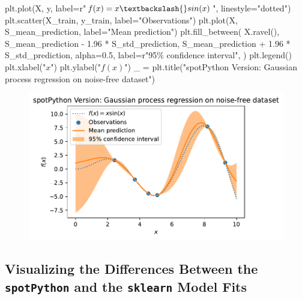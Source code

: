 \documentclass[
  letterpaper,
  DIV=11,
  numbers=noendperiod]{scrreprt}
\newenvironment{Shaded}{\begin{snugshade}}{\end{snugshade}}
\newcommand{\FloatTok}[1]{\textcolor[rgb]{0.68,0.00,0.00}{#1}}
\newcommand{\NormalTok}[1]{\textcolor[rgb]{0.00,0.23,0.31}{#1}}
\newcommand{\OperatorTok}[1]{\textcolor[rgb]{0.37,0.37,0.37}{#1}}
\newcommand{\SpecialCharTok}[1]{\textcolor[rgb]{0.37,0.37,0.37}{#1}}
\newcommand{\StringTok}[1]{\textcolor[rgb]{0.13,0.47,0.30}{#1}}
\newcommand{\VerbatimStringTok}[1]{\textcolor[rgb]{0.13,0.47,0.30}{#1}}
\begin{document}
\begin{Shaded}
\begin{Highlighting}[]
\NormalTok{plt.plot(X, y, label}\OperatorTok{=}\VerbatimStringTok{r"$f(x) = x \textbackslash{}sin(x)$"}\NormalTok{, linestyle}\OperatorTok{=}\StringTok{"dotted"}\NormalTok{)}
\NormalTok{plt.scatter(X\_train, y\_train, label}\OperatorTok{=}\StringTok{"Observations"}\NormalTok{)}
\NormalTok{plt.plot(X, S\_mean\_prediction, label}\OperatorTok{=}\StringTok{"Mean prediction"}\NormalTok{)}
\NormalTok{plt.fill\_between(}
\NormalTok{    X.ravel(),}
\NormalTok{    S\_mean\_prediction }\OperatorTok{{-}} \FloatTok{1.96} \OperatorTok{*}\NormalTok{ S\_std\_prediction,}
\NormalTok{    S\_mean\_prediction }\OperatorTok{+} \FloatTok{1.96} \OperatorTok{*}\NormalTok{ S\_std\_prediction,}
\NormalTok{    alpha}\OperatorTok{=}\FloatTok{0.5}\NormalTok{,}
\NormalTok{    label}\OperatorTok{=}\VerbatimStringTok{r"95}\SpecialCharTok{\% c}\VerbatimStringTok{onfidence interval"}\NormalTok{,}
\NormalTok{)}
\NormalTok{plt.legend()}
\NormalTok{plt.xlabel(}\StringTok{"$x$"}\NormalTok{)}
\NormalTok{plt.ylabel(}\StringTok{"$f(x)$"}\NormalTok{)}
\NormalTok{\_ }\OperatorTok{=}\NormalTok{ plt.title(}\StringTok{"spotPython Version: Gaussian process regression on noise{-}free dataset"}\NormalTok{)}
\end{Highlighting}
\end{Shaded}

\begin{figure}[H]

{\centering \includegraphics{06_spot_gaussian_files/figure-pdf/cell-7-output-1.pdf}

}

\end{figure}

\hypertarget{visualizing-the-differences-between-the-spotpython-and-the-sklearn-model-fits}{%
\subsection{\texorpdfstring{Visualizing the Differences Between the
\texttt{spotPython} and the \texttt{sklearn} Model
Fits}{Visualizing the Differences Between the spotPython and the sklearn Model Fits}}\label{visualizing-the-differences-between-the-spotpython-and-the-sklearn-model-fits}}
\end{document}
